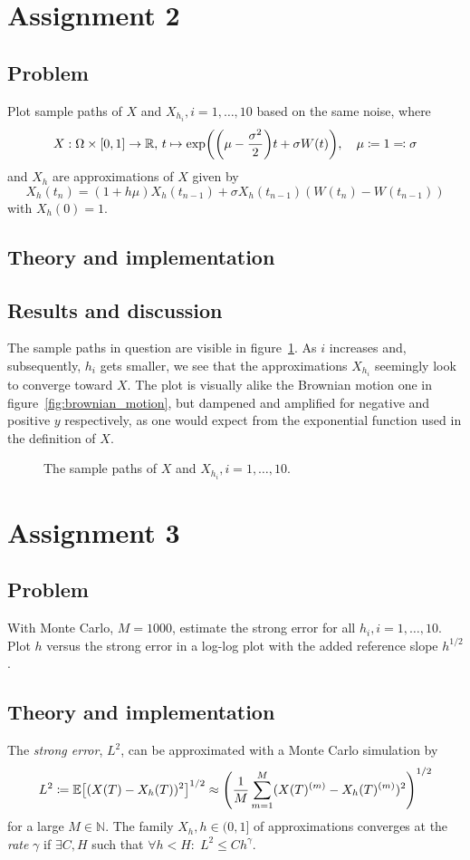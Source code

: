 \documentclass[11pt, a4paper]{article}
\let\originalleft\left
\let\originalright\right
\renewcommand{\left}{\mathopen{}\mathclose\bgroup\originalleft}
\renewcommand{\right}{\aftergroup\egroup\originalright}
\begin{document}
\section{Assignment 2}
\subsection{Problem}
Plot sample paths of $X$ and $X_{h_i}, i = 1, \ldots, 10$ based on the same noise,
where
$$ X : \Omega \times [0, 1] \to \mathbb R, \, t \mapsto \exp\left(\left(\mu - \frac{\sigma^2}2\right) t + \sigma W(t)\right), \quad \mu \coloneqq 1 \eqqcolon \sigma $$
and $X_h$ are approximations of $X$ given by
$$ X_h(t_n) = (1 + h \mu) X_h(t_{n-1}) + \sigma X_h(t_{n-1}) (W(t_n) - W(t_{n-1})) $$
with $X_h(0) = 1$.
\subsection{Theory and implementation}
\subsection{Results and discussion}
The sample paths in question are visible in figure~\ref{fig:x_sample_path}.
As $i$ increases and, subsequently, $h_i$ gets smaller,
we see that the approximations $X_{h_i}$ seemingly look to converge toward $X$.
The plot is visually alike the Brownian motion one in figure~\ref{fig:brownian_motion},
but dampened and amplified for negative and positive $y$ respectively,
as one would expect from the exponential function used in the definition of $X$.

\begin{figure}
	\centering
	
	\caption{The sample paths of $X$ and $X_{h_i}, i = 1, \ldots, 10$. \label{fig:x_sample_path}}
\end{figure}

\section{Assignment 3}
\subsection{Problem}
With Monte Carlo, $M = 1000$, estimate the strong error for all $h_i, i = 1, \ldots, 10$.
Plot $h$ versus the strong error in a log-log plot with the added reference slope $h^{1/2}$.
\subsection{Theory and implementation}
The \emph{strong error}, $L^2$, can be approximated with a Monte Carlo simulation by
$$ L^2 \coloneqq \mathbb E\left[(X(T) - X_h(T))^2\right]^{1/2}
	\approx \left(\frac1M \sum_{m=1}^M (X(T)^{(m)} - X_h(T)^{(m)})^2\right)^{1/2} $$
for a large $M \in \mathbb N$.
The family $X_h, h \in (0, 1]$ of approximations converges at the \emph{rate} $\gamma$
if $\exists C, H$ such that $\forall h < H: \; L^2 \le Ch^\gamma$.
\end{document}
